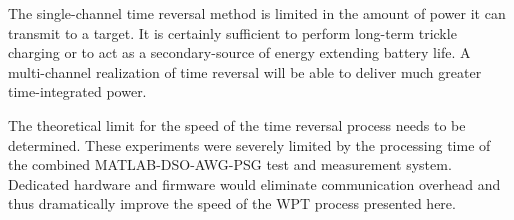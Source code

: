


The single-channel time reversal method is limited in the amount of power it can
transmit to a target.
%
It is certainly sufficient to perform long-term trickle charging or to act as a
secondary-source of energy extending battery life.
%
A multi-channel realization of time reversal will be able to deliver much
greater time-integrated power.



The theoretical limit for the speed of the time reversal process needs to be
determined.
%
These experiments were severely limited by the processing time of the combined
MATLAB-DSO-AWG-PSG test and measurement system.
%
Dedicated hardware and firmware would eliminate communication overhead and thus
dramatically improve the speed of the WPT process presented here.
